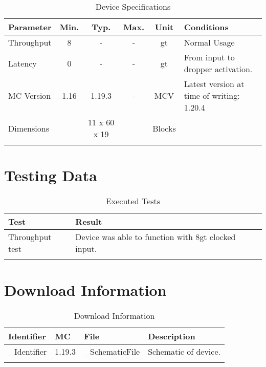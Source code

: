 \documentclass[10pt]{datasheet}
\begin{document}
\begin{table}[h]
    \caption{Device Specifications}
    \begin{tabularx}{\textwidth}{l | c c c | c | X}
        \thickhline
        \textbf{Parameter} & \textbf{Min.} & \textbf{Typ.} & \textbf{Max.} &
        \textbf{Unit} & \textbf{Conditions} \\
        \hline
        Throughput  & 8 & - & - & gt & Normal Usage \\
        \hline
        Latency    & 0 & - & - & gt & From input to dropper activation. \\
        \hline
        MC Version & 1.16 & 1.19.3 & - & MCV & Latest version at time of writing: 1.20.4\\
        \hline
        Dimensions & & 11 x 60 x 19 & & Blocks & \\
        \thickhline
\end{tabularx}
\end{table}
\newpage
\section{Testing Data}
\begin{table}[h]
\caption{Executed Tests}
\begin{tabularx}{\textwidth}{l | X}
    \thickhline
    \textbf{Test} & \textbf{Result} \\
    \hline
    Throughput test & Device was able to function with 8gt clocked input. \\
    \thickhline
\end{tabularx}
\end{table}

\section{Download Information}
\begin{table}[h]
    \caption{Download Information}
    \begin{tabularx}{\textwidth}{l | l | l | X}
        \thickhline
        \textbf{Identifier} & \textbf{MC} & \textbf{File} & \textbf{Description} \\
        \hline
        _Identifier & 1.19.3 & _SchematicFile & Schematic of device. \\
        \hline
        \thickhline
    \end{tabularx}
\end{table}
\end{document}
